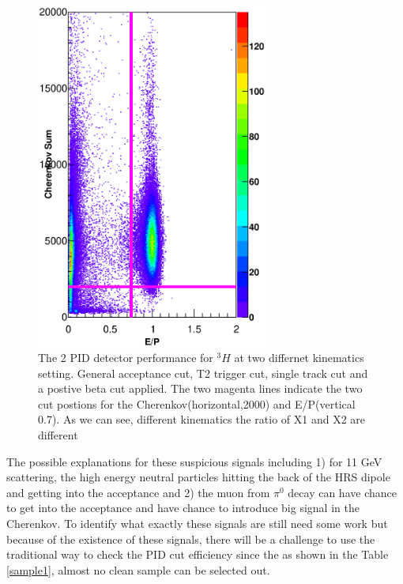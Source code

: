 \begin{figure}[htbp]
{\begin{minipage}[t]{0.4\linewidth}
\includegraphics[width=3in]{pid2.eps}
\end{minipage}
}
\centering
\caption{The 2 PID detector performance for $^{3}H$ at two differnet kinematics setting. General acceptance cut, T2 trigger cut, single track cut and a postive beta cut applied. The two magenta lines indicate the two cut postions for the Cherenkov(horizontal,2000) and E/P(vertical 0.7).  As we can see, different kinematics the ratio of X1 and X2 are different}
\label{pid1}
\end{figure}
The possible explanations for these suspicious signals including 1) for 11 GeV scattering, the high energy neutral particles hitting the back of the HRS dipole and getting into the acceptance and 2) the muon from $\pi^{0}$ decay can have chance to get into the acceptance and have chance to introduce big signal in the Cherenkov. To identify what exactly these signals are still need some work but because of the existence of these signals, there will be a challenge to use the traditional way to check the PID cut efficiency since the as shown in the Table \ref{sample1}, almost no clean sample can be selected out. 
